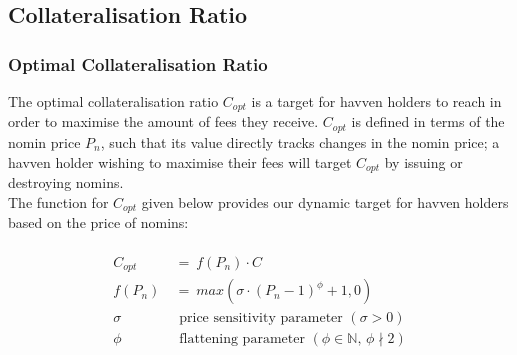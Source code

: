 \newpage
\subsection{Collateralisation Ratio}
\subsubsection{Optimal Collateralisation Ratio}

\noindent The optimal collateralisation ratio $C_{opt}$ is a target for
havven holders to reach in order to maximise the amount of fees they receive.
$C_{opt}$ is defined in terms of the nomin price $P_n$, such that its value
directly tracks changes in the nomin price; a havven holder wishing to
maximise their fees will target $C_{opt}$ by issuing or destroying nomins. \\

\noindent The function for $C_{opt}$ given below provides our dynamic target
for havven holders based on the price of nomins:

\begin{gather} \label{eq:optcollateralisation}
\begin{align}
\begin{split}
C_{opt} \ &= \ f(P_{n}) \cdot C  \\ 
f(P_n) \ &= \ max(\sigma \cdot (P_n - 1)^{\phi} + 1, 0) \\
\sigma \ & \text{ \ price sensitivity parameter } (\sigma > 0)\\
\phi   \ & \text{ \ flattening parameter } (\phi \in \mathbb{N} \text{, } \phi \nmid 2) \\
\end{split}
\end{align}
\end{gather}


\begin{center}
\end{center}

